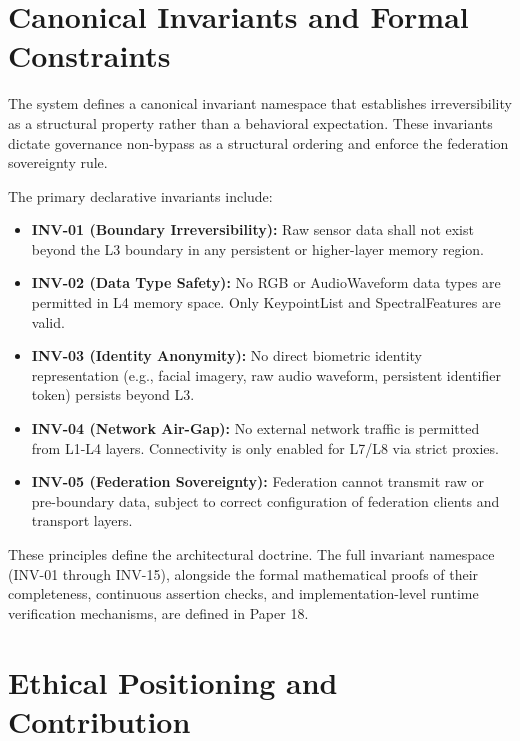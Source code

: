 \documentclass[conference]{IEEEtran}
\begin{document}
\section{Canonical Invariants and Formal Constraints}

The system defines a canonical invariant namespace that establishes irreversibility as a structural property rather than a behavioral expectation. These invariants dictate governance non-bypass as a structural ordering and enforce the federation sovereignty rule.

The primary declarative invariants include:
\begin{itemize}
    \item \textbf{INV-01 (Boundary Irreversibility):} Raw sensor data shall not exist beyond the L3 boundary in any persistent or higher-layer memory region.
    \item \textbf{INV-02 (Data Type Safety):} No RGB or AudioWaveform data types are permitted in L4 memory space. Only KeypointList and SpectralFeatures are valid.
    \item \textbf{INV-03 (Identity Anonymity):} No direct biometric identity representation (e.g., facial imagery, raw audio waveform, persistent identifier token) persists beyond L3.
    \item \textbf{INV-04 (Network Air-Gap):} No external network traffic is permitted from L1-L4 layers. Connectivity is only enabled for L7/L8 via strict proxies.
    \item \textbf{INV-05 (Federation Sovereignty):} Federation cannot transmit raw or pre-boundary data, subject to correct configuration of federation clients and transport layers. 
\end{itemize}

These principles define the architectural doctrine. The full invariant namespace (INV-01 through INV-15), alongside the formal mathematical proofs of their completeness, continuous assertion checks, and implementation-level runtime verification mechanisms, are defined in Paper 18.

\section{Ethical Positioning and Contribution}
\end{document}
